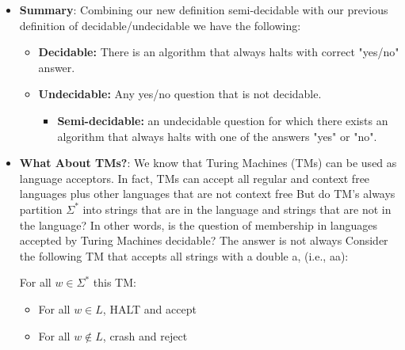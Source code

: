 \documentclass{report}
\begin{document}
\begin{itemize}
            \bigbreak \noindent 
            \begin{figure}[ht]
                \centering
                \label{fig:sd1}
            \end{figure}
        \item \textbf{Summary}: Combining our new definition semi-decidable with our previous definition of decidable/undecidable we have the following:
            \begin{itemize}
                \item \textbf{Decidable:} There is an algorithm that always halts with correct "yes/no" answer.
                \item \textbf{Undecidable:} Any yes/no question that is not decidable.
                    \begin{itemize}
                        \item \textbf{Semi-decidable:} an undecidable question for which there exists an algorithm that always halts with one of the answers "yes" or "no".
                    \end{itemize}
            \end{itemize}
        \item \textbf{What About TMs?}: We know that Turing Machines (TMs) can be used as language acceptors.
            \bigbreak \noindent 
            In fact, TMs can accept all regular and context free languages plus other languages that are not context free
            \bigbreak \noindent 
            But do TM's always partition $\Sigma^{*}$ into strings that are in the language and strings that are not in the language?
            \bigbreak \noindent 
            In other words, is the question of membership in languages accepted by Turing Machines decidable?
            \bigbreak \noindent 
            The answer is not always
            \pagebreak \bigbreak \noindent 
            Consider the following TM that accepts all strings with a double a, (i.e., aa):
            \bigbreak \noindent 
            \begin{figure}[ht]
                \centering
                \label{fig:tm1}
            \end{figure}
            \bigbreak \noindent 
            For all $w\in \Sigma^{*}$ this TM:
            \begin{itemize}
                \item For all $w \in L$, HALT and accept
                \item For all $w \not\in L$, crash and reject

\end{itemize}
\end{itemize}
\end{document}
